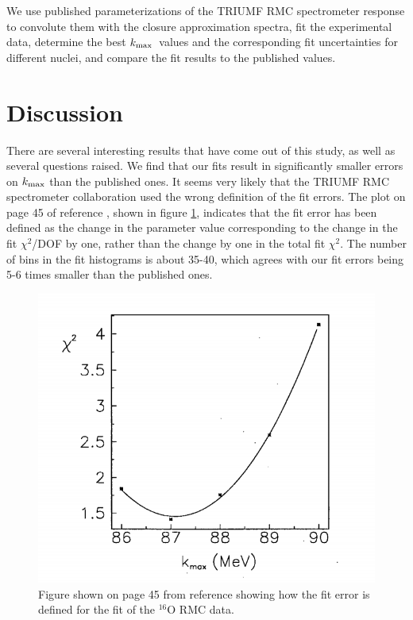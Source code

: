 \documentclass[12pt]{article}
\newcommand {\kmax}         {\mbox{$k_{\rm max}$}}
\begin{document}
We use published parameterizations of the TRIUMF RMC spectrometer response
to convolute them with the closure approximation spectra, fit the experimental data,
determine the best \kmax\ values and the corresponding fit uncertainties
for different nuclei, and compare the fit results to the published values.




\section { Discussion }
There are several interesting results that have come out of this study, as well as several
questions raised. We find that our fits result in significantly
smaller errors on $\kmax$ than the published ones. It seems very likely that the TRIUMF 
RMC spectrometer collaboration used the wrong definition of the fit errors. The plot on 
page 45 of reference \cite{RMC_1995_Bergbusch_MS_thesis}, shown in figure \ref{fig:BergbuschChiSq}, 
indicates that the fit error has been defined as the change in the parameter value
corresponding to the change in the fit $\chi^2$/DOF by one, rather than the change
by one in the total fit $\chi^2$. The number of bins in the fit histograms
is about 35-40, which agrees with our fit errors being 5-6 times smaller than
the published ones.


  \begin{figure}[h]
    \centering
    \includegraphics[width=0.8\linewidth]{figures/png/Bergbusch_O16_chisq_plot.png}
    \caption{Figure shown on page 45 from reference \cite{RMC_1995_Bergbusch_MS_thesis} showing
    how the fit error is defined for the fit of the $^{16}$O RMC data. }
    \label{fig:BergbuschChiSq}
  \end{figure}
\end{document}
